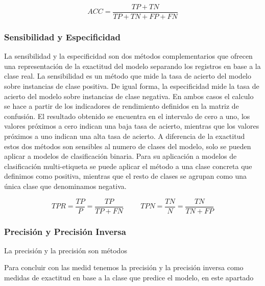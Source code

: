 \bigbreak

\begin{equation}\tag*{}
    ACC = \frac{TP+TN}{TP+TN+FP+FN}
\end{equation}


\subsubsection{Sensibilidad y Especificidad}

La sensibilidad y la especificidad son dos métodos complementarios que ofrecen una representación de la exactitud del modelo separando los registros en base a la clase real. La sensibilidad es un método que mide la tasa de acierto del modelo sobre instancias de clase positiva. De igual forma, la especificidad mide la tasa de acierto del modelo sobre instancias de clase negativa. En ambos casos el calculo se hace a partir de los indicadores de rendimiento definidos en la matriz de confusión. El resultado obtenido se encuentra en el intervalo de cero a uno, los valores próximos a cero indican una baja tasa de acierto, mientras que los valores próximos a uno indican una alta tasa de acierto. A diferencia de la exactitud estos dos métodos son sensibles al numero de clases del modelo, solo se pueden aplicar a modelos de clasificación binaria. Para su aplicación a modelos de clasificación multi-etiqueta se puede aplicar el método a una clase concreta que definimos como positiva, mientras que el resto de clases se agrupan como una única clase que denominamos negativa.

\bigbreak
\begin{equation}\tag*{}
    TPR = \frac{TP}{P} = \frac{TP}{TP+FN}
    \hspace{1cm}
    TPN = \frac{TN}{N} = \frac{TN}{TN+FP}
\end{equation}



\subsubsection{Precisión y Precisión Inversa}

La precisión y la precisión son métodos

Para concluir con las medid tenemos la precisión y la precisión inversa como medidas de exactitud en base a la clase que predice el modelo, en este apartado 

